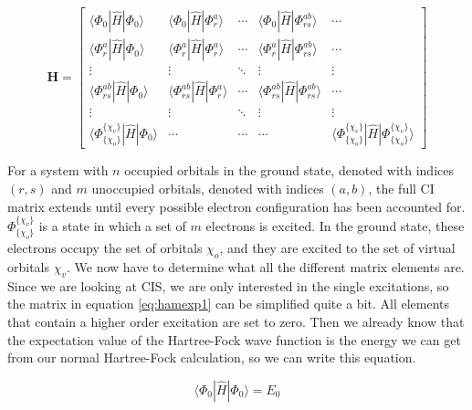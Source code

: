 \documentclass[twoside,twocolumn,9pt]{article}
\begin{document}
\begin{equation}\label{eq:hamexp1}
  \boldsymbol{H} = \begin{bmatrix}
    \langle \Phi_0 | \hat{H} | \Phi_0 \rangle         & \langle \Phi_0 | \hat{H} | \Phi_r^a \rangle         & \cdots & \langle \Phi_0 | \hat{H} | \Phi_{rs}^{ab} \rangle         & \cdots \\
    \langle \Phi_r^a | \hat{H} | \Phi_0 \rangle       & \langle \Phi_r^a | \hat{H} | \Phi_r^a \rangle       & \cdots & \langle \Phi_r^a |\hat{H} | \Phi_{rs}^{ab} \rangle        & \cdots \\
    \vdots                                            & \vdots                                              & \ddots & \vdots                                                    & \vdots \\
    \langle \Phi_{rs}^{ab} | \hat{H} | \Phi_0 \rangle & \langle \Phi_{rs}^{ab} | \hat{H} | \Phi_r^a \rangle & \cdots & \langle \Phi_{rs}^{ab} | \hat{H} | \Phi_{rs}^{ab} \rangle & \cdots \\
    \vdots                                            & \vdots                                              & \ddots & \vdots & \vdots \\
    \langle \Phi_{\{\chi_o\}}^{\{\chi_v\}} | \hat{H} | \Phi_0 \rangle & \cdots & \cdots & \cdots & \langle \Phi_{\{\chi_o\}}^{\{\chi_v\}} | \hat{H} | \Phi_{\{\chi_o\}}^{\{\chi_v\}} \rangle
  \end{bmatrix}
\end{equation}

For a system with $n$ occupied orbitals in the ground state, denoted with indices $(r, s)$ and $m$ unoccupied orbitals, denoted with indices $(a,b)$, the full CI matrix extends until
every possible electron configuration has been accounted for. $\Phi_{\{\chi_o\}}^{\{\chi_v\}}$ is a state in which a set of $m$ electrons is excited. In the ground state, these 
electrons occupy the set of orbitals {$\chi_o$}, and they are excited to the set of virtual orbitals {$\chi_v$}.
We now have to determine what all the different matrix elements are. Since we are looking at CIS, we are only interested in the single excitations, so the matrix in equation
\eqref{eq:hamexp1} can be simplified quite a bit. All elements that contain a higher order excitation are set to zero. Then we already know that the expectation value of the Hartree-Fock wave function is the energy we can get from our normal
Hartree-Fock calculation, so we can write this equation.

\begin{equation}\label{eq:E0}
  \langle \Phi_0 | \hat{H} | \Phi_0 \rangle = E_0
\end{equation}
\end{document}
